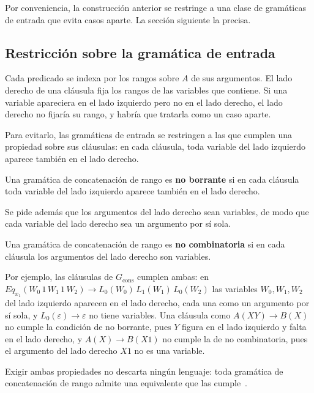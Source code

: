 Por conveniencia, la construcción anterior se restringe a una clase
de gramáticas de entrada que evita casos aparte. La sección siguiente
la precisa.

\subsection{Restricción sobre la gramática de entrada}

Cada predicado se indexa por los rangos sobre $A$ de sus argumentos.
El lado derecho de una cláusula fija los rangos de las variables que
contiene. Si una variable apareciera en el lado izquierdo pero no en el
lado derecho, el lado derecho no fijaría su rango, y habría que tratarla como un
caso aparte.

Para evitarlo, las gramáticas de entrada se restringen a las que
cumplen una propiedad sobre sus cláusulas: en cada cláusula, toda
variable del lado izquierdo aparece también en el lado derecho.

\begin{definicion}
Una gramática de concatenación de rango es \textbf{no borrante}
si en cada cláusula toda variable del lado izquierdo aparece también en el
lado derecho.
\end{definicion}

Se pide además que los argumentos del lado derecho sean variables, de modo
que cada variable del lado derecho sea un argumento por sí sola.

\begin{definicion}
Una gramática de concatenación de rango es \textbf{no combinatoria} si
en cada cláusula los argumentos del lado derecho son variables.
\end{definicion}

Por ejemplo, las cláusulas de $G_{\mathrm{cons}}$ cumplen ambas: en
$Eq_{x_1}(W_0\,1\,W_1\,1\,W_2) \to L_0(W_0)\,L_1(W_1)\,L_0(W_2)$ las
variables $W_0, W_1, W_2$ del lado izquierdo aparecen en el lado derecho,
cada una como un argumento por sí sola, y $L_0(\varepsilon) \to
\varepsilon$ no tiene variables. Una cláusula como $A(XY) \to B(X)$ no
cumple la condición de no borrante, pues $Y$ figura en el lado izquierdo
y falta en el lado derecho, y $A(X) \to B(X1)$ no cumple la de no
combinatoria, pues el argumento del lado derecho $X1$ no es una variable.

Exigir ambas propiedades no descarta ningún lenguaje: toda gramática de
concatenación de rango admite una equivalente que las
cumple~\cite{boullier1998proposal, kallmeyer2010parsing}.

